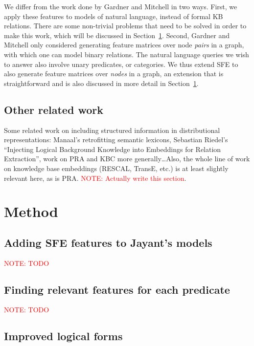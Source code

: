 \documentclass[11pt]{article}
\newcommand{\secref}[1]{Section~\ref{sec:#1}}
\newcommand{\mattnote}[1]{\textcolor{red}{NOTE: #1}}
\begin{document}
We differ from the work done by Gardner and Mitchell in two ways.  First, we
apply these features to models of natural language, instead of formal KB
relations.  There are some non-trivial problems that need to be solved in order
to make this work, which will be discussed in \secref{method}.  Second, Gardner
and Mitchell only considered generating feature matrices over node \emph{pairs}
in a graph, with which one can model binary relations.  The natural language
queries we wish to answer also involve unary predicates, or categories.  We
thus extend SFE to also generate feature matrices over \emph{nodes} in a graph,
an extension that is straightforward and is also discussed in more detail in
\secref{method}.

\subsection{Other related work}

Some related work on including structured information in distributional
representations: Manaal's retrofitting semantic lexicons, Sebastian Riedel's
``Injecting Logical Background Knowledge into Embeddings for Relation
Extraction'', work on PRA and KBC more generally\ldots Also, the whole line of
work on knowledge base embeddings (RESCAL, TransE, etc.) is at least slightly
relevant here, as is PRA.  \mattnote{Actually write
this section}.

\section{Method}
\label{sec:method}

\subsection{Adding SFE features to Jayant's models}
\label{sec:formal-and-distributional}

\mattnote{TODO}

\subsection{Finding relevant features for each predicate}
\label{sec:computing-pmi}

\mattnote{TODO}

\subsection{Improved logical forms}
\label{sec:better-lfs}
\end{document}
